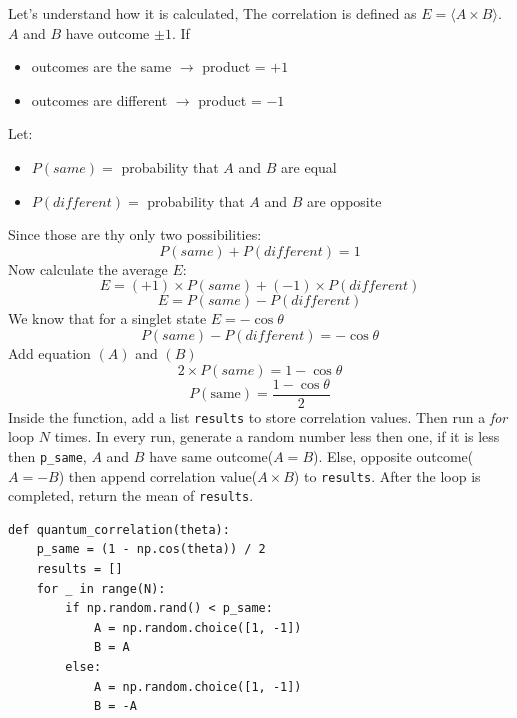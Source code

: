 \documentclass[17pt,a4paper]{extarticle}
\begin{document}
\begin{enumerate}
Let's understand how it is calculated, The correlation is defined as $E = \langle A \times B \rangle$. $A$ and $B$ have outcome $\pm1$. If
\begin{itemize}
\item outcomes are the same $\rightarrow$ product = $+1$
\item outcomes are different $\rightarrow$ product = $-1$
\end{itemize}
Let:
\begin{itemize}
\item $P(same)=$ probability that $A$ and $B$ are equal
\item $P(different)=$ probability that $A$ and $B$ are opposite
\end{itemize}
Since those are thy only two possibilities:
{
\renewcommand{\theequation}{\Alph{equation}}
\setcounter{equation}{0}
\begin{equation}
P(same)+P(different)=1
\end{equation}
}
Now calculate the average $E$:
\setcounter{equation}{0}
\begin{equation}
E=(+1) \times P(same) + (-1) \times P(different)
\end{equation}
\begin{equation}
E=P(same) - P(different)
\end{equation}
We know that for a singlet state $E = - \cos \theta$
{
\renewcommand{\theequation}{\Alph{equation}}
\setcounter{equation}{1}
\begin{equation}
P(same) - P(different) = - \cos \theta
\end{equation}
}
Add equation $(A)$ and $(B)$
\setcounter{equation}{0}
\begin{equation}
2 \times P(same) = 1 - \cos \theta
\end{equation}
\begin{equation}
P(\text{same}) = \frac{1 - \cos \theta}{2}
\end{equation}
Inside the function, add a list \texttt{results} to store correlation values. Then run a \textit{for} loop $N$ times. In every run, generate a random number less then one, if it is less then \texttt{p\_same}, $A$ and $B$ have same outcome($A=B$). Else, opposite outcome($A=-B$) then append correlation value($A \times B$) to \texttt{results}. After the loop is completed, return the mean of \texttt{results}.
\begin{lstlisting}
def quantum_correlation(theta):
    p_same = (1 - np.cos(theta)) / 2
    results = []
    for _ in range(N):
        if np.random.rand() < p_same:
            A = np.random.choice([1, -1])
            B = A
        else:
            A = np.random.choice([1, -1])
            B = -A


\end{lstlisting}
\end{enumerate}
\end{document}
